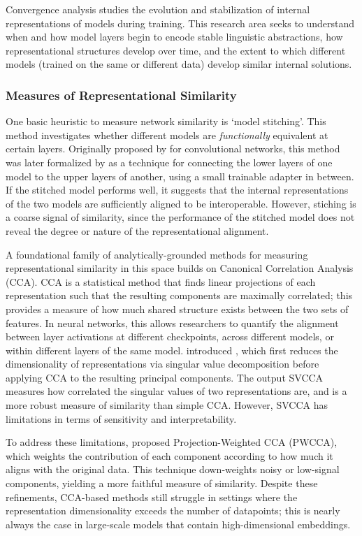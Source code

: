 Convergence analysis studies the evolution and stabilization of internal representations of models during training. This research area seeks to understand when and how model layers begin to encode stable linguistic abstractions, how representational structures develop over time, and the extent to which different models (trained on the same or different data) develop similar internal solutions.

\subsubsection{Measures of Representational Similarity}

One basic heuristic to measure network similarity is `model stitching'. This method investigates whether different models are \textit{functionally} equivalent at certain layers. Originally proposed by \citet{lenc2015understanding} for convolutional networks, this method was later formalized by \citet{bansal2021stitch} as a technique for connecting the lower layers of one model to the upper layers of another, using a small trainable adapter in between. If the stitched model performs well, it suggests that the internal representations of the two models are sufficiently aligned to be interoperable. However, stiching is a coarse signal of similarity, since the performance of the stitched model does not reveal the degree or nature of the representational alignment.

A foundational family of analytically-grounded methods for measuring representational similarity in this space builds on Canonical Correlation Analysis (CCA). CCA is a statistical method that finds linear projections of each representation such that the resulting components are maximally correlated; this provides a measure of how much shared structure exists between the two sets of features. In neural networks, this allows researchers to quantify the alignment between layer activations at different checkpoints, across different models, or within different layers of the same model. \citet{raghu2017svcca} introduced , which first reduces the dimensionality of representations via singular value decomposition before applying CCA to the resulting principal components. The output SVCCA measures how correlated the singular values of two representations are, and is a more robust measure of similarity than simple CCA. However, SVCCA has limitations in terms of sensitivity and interpretability.

To address these limitations, \citet{morcos2018pwcca} proposed Projection-Weighted CCA (PWCCA), which weights the contribution of each component according to how much it aligns with the original data. This technique down-weights noisy or low-signal components, yielding a more faithful measure of similarity. Despite these refinements, CCA-based methods still struggle in settings where the representation dimensionality exceeds the number of datapoints; this is nearly always the case in large-scale models that contain high-dimensional embeddings.

